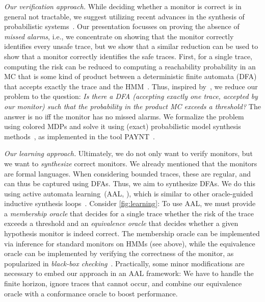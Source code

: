 \documentclass[runningheads]{llncs}
\renewcommand{\paragraph}[1]{\smallskip\noindent\emph{#1}}
\begin{document}
\paragraph{Our verification approach.}
While deciding whether a monitor is correct is in general not tractable, we suggest utilizing recent advances in the synthesis of probabilistic systems~\cite{andriushchenkoPAYNTToolInductive2021}.
Our presentation focusses on proving the absence of \emph{missed alarms}, i.e., we concentrate on showing that the monitor correctly identifies every unsafe trace, but we show that a similar reduction can be used to show that a monitor correctly identifies the safe traces.
First, for a single trace, computing the risk can be reduced to computing a reachability probability in an MC that is some kind of product between a deterministic finite automata (DFA) that accepts exactly the trace and the HMM~\cite{jungesRuntimeMonitorsMarkov2021}.
Thus, inspired by~\cite{DBLP:conf/tacas/BadingsVJSJ24}, we reduce our problem to the question: \emph{Is there a DFA (accepting exactly one trace, accepted by our monitor)
    such that the probability in the product MC exceeds a threshold?}
The answer is no iff the monitor has no missed alarms.
We formalize the problem using colored MDPs and solve it using (exact) probabilistic model synthesis methods~\cite{DBLP:conf/uai/Andriushchenko022}, as implemented in the tool PAYNT~\cite{andriushchenkoPAYNTToolInductive2021}.

\paragraph{Our learning approach.}
Ultimately, we do not only want to verify monitors, but we want to \emph{synthesize} correct monitors.
We already mentioned that the monitors are formal languages. When considering bounded traces, these are regular, and can thus be captured using DFAs. Thus, we aim to synthesize DFAs.
We do this using active automata learning~(AAL, \cite{DBLP:journals/iandc/Angluin87,DBLP:journals/cacm/Vaandrager17}), which is similar to other oracle-guided inductive synthesis loops~\cite{DBLP:journals/acta/JhaS17}.
Consider \cref{fig:learning}:
To use AAL, we must provide a \emph{membership oracle} that decides for a single trace whether the risk of the trace exceeds a threshold and an \emph{equivalence oracle} that decides whether a given hypothesis monitor is indeed correct. The membership oracle can be implemented via inference for standard monitors on HMMs (see above), while the equivalence oracle can be implemented by verifying the correctness of the monitor, as popularized in \emph{black-box checking}~\cite{DBLP:journals/jalc/PeledVY02}.
Practically, some minor modifications are necessary to embed our approach in an AAL framework: We have to handle the finite horizon, ignore traces that cannot occur, and combine our equivalence oracle with a conformance oracle to boost performance.
\end{document}
